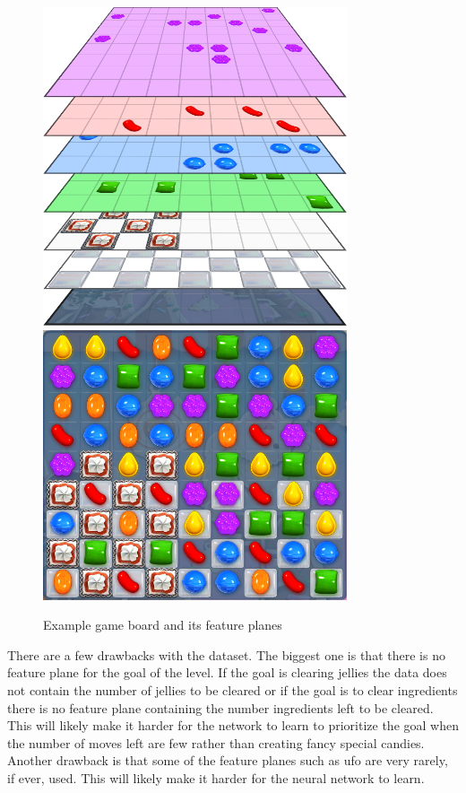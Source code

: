\documentclass{kththesis}
\begin{document}
\begin{figure}
\centering
\includegraphics[width=0.8\textwidth]{images/game_board_feature_planes.png}
\includegraphics[width=0.8\textwidth]{images/game_board.png}

\label{fig:game_board}
\caption{Example game board and its feature planes}
\end{figure}

There are a few drawbacks with the dataset.  The biggest one is that there is no feature plane for the goal of the level. If the goal is clearing jellies the data does not contain the number of jellies to be cleared or if the goal is to clear ingredients there is no feature plane containing the number ingredients left to be cleared. This will likely make it harder for the network to learn to prioritize the goal when the number of moves left are few rather than creating fancy special candies. Another drawback is that some of the feature planes such as ufo are very rarely, if ever, used. This will likely make it harder for the neural network to learn.
 
\end{document}
